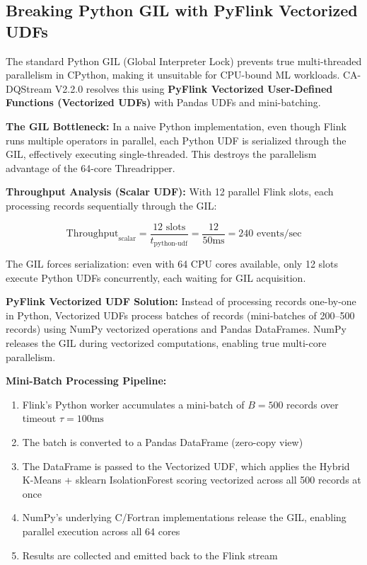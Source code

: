 \subsection{Breaking Python GIL with PyFlink Vectorized UDFs}

The standard Python GIL (Global Interpreter Lock) prevents true multi-threaded parallelism in CPython, making it unsuitable for CPU-bound ML workloads. CA-DQStream V2.2.0 resolves this using \textbf{PyFlink Vectorized User-Defined Functions (Vectorized UDFs)} with Pandas UDFs and mini-batching.

\textbf{The GIL Bottleneck:} In a naive Python implementation, even though Flink runs multiple operators in parallel, each Python UDF is serialized through the GIL, effectively executing single-threaded. This destroys the parallelism advantage of the 64-core Threadripper.

\textbf{Throughput Analysis (Scalar UDF):} With 12 parallel Flink slots, each processing records sequentially through the GIL:

\begin{equation}
\text{Throughput}_{\text{scalar}} = \frac{12 \text{ slots}}{t_{\text{python-udf}}} = \frac{12}{50\text{ms}} = 240 \text{ events/sec}
\end{equation}

The GIL forces serialization: even with 64 CPU cores available, only 12 slots execute Python UDFs concurrently, each waiting for GIL acquisition.

\textbf{PyFlink Vectorized UDF Solution:} Instead of processing records one-by-one in Python, Vectorized UDFs process batches of records (mini-batches of 200--500 records) using NumPy vectorized operations and Pandas DataFrames. NumPy releases the GIL during vectorized computations, enabling true multi-core parallelism.

\textbf{Mini-Batch Processing Pipeline:}
\begin{enumerate}
    \item Flink's Python worker accumulates a mini-batch of $B = 500$ records over timeout $\tau = 100\text{ms}$
    \item The batch is converted to a Pandas DataFrame (zero-copy view)
    \item The DataFrame is passed to the Vectorized UDF, which applies the Hybrid K-Means + sklearn IsolationForest scoring vectorized across all 500 records at once
    \item NumPy's underlying C/Fortran implementations release the GIL, enabling parallel execution across all 64 cores
    \item Results are collected and emitted back to the Flink stream
\end{enumerate}

